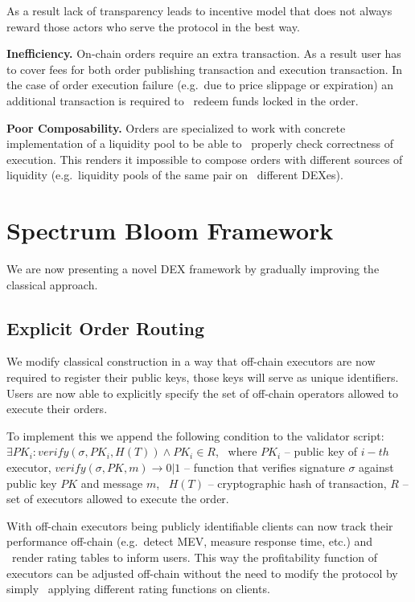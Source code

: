 \documentclass[11pt]{article}
\begin{document}
\begin{sloppypar}
        As a result lack of transparency leads to incentive model that does not always reward those actors who serve the protocol in the best way.

        \textbf{Inefficiency.} On-chain orders require an extra transaction.
        As a result user has to cover fees for both order publishing transaction and execution transaction.
        In the case of order execution failure (e.g.\ due to price slippage or expiration) an additional transaction is required to \
        redeem funds locked in the order.

        \textbf{Poor Composability.} Orders are specialized to work with concrete implementation of a liquidity pool to be able to \
        properly check correctness of execution.
        This renders it impossible to compose orders with different sources of liquidity (e.g.\ liquidity pools of the same pair on \
        different DEXes).


        \section{Spectrum Bloom Framework}\label{sec:spectrum-framework}
        We are now presenting a novel DEX framework by gradually improving the classical approach.

        \subsection{Explicit Order Routing}\label{subsec:making-execution-transparent}
        We modify classical construction in a way that off-chain executors are now required to register their public keys, those keys will serve as unique identifiers.
        Users are now able to explicitly specify the set of off-chain operators allowed to execute their orders.

        To implement this we append the following condition to the validator script: \
        $\exists PK_i: verify(\sigma, PK_i, H(T)) \wedge PK_i \in R$, \
        where $PK_i$ -- public key of $i-th$ executor, $verify(\sigma, PK, m) \rightarrow 0 | 1$ -- function that verifies signature $\sigma$ against public key $PK$ and message $m$, \
        $H(T)$ -- cryptographic hash of transaction, $R$ -- set of executors allowed to execute the order.

        With off-chain executors being publicly identifiable clients can now track their performance off-chain (e.g.\ detect MEV, measure response time, etc.) and \
        render rating tables to inform users.
        This way the profitability function of executors can be adjusted off-chain without the need to modify the protocol by simply \
        applying different rating functions on clients.


\end{sloppypar}
\end{document}
